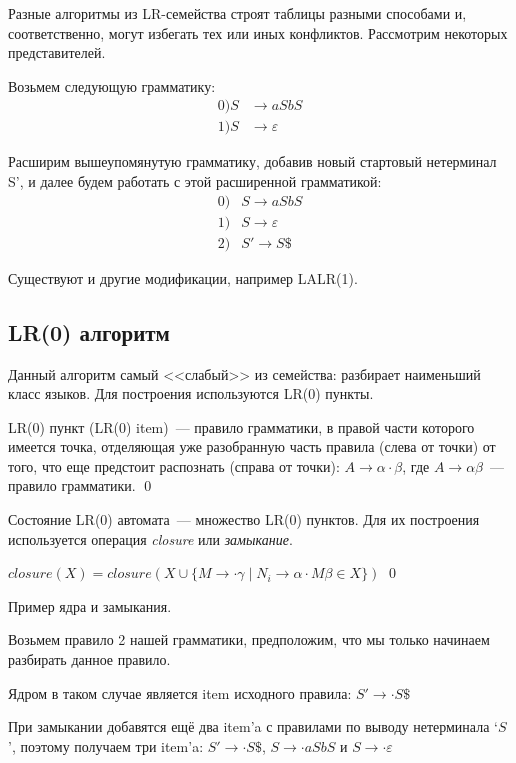 Разные алгоритмы из LR-семейства строят таблицы разными способами и, соответственно, могут избегать тех или иных конфликтов. Рассмотрим некоторых представителей.

Возьмем следующую грамматику:
\begin{align*}
0) S & \rightarrow a S b S \\
1) S & \rightarrow \varepsilon
\end{align*}

Расширим вышеупомянутую грамматику, добавив новый стартовый нетерминал S', и далее будем работать с этой расширенной грамматикой:
\begin{align*}
0)& S \rightarrow a S b S \\
1)& S \rightarrow \varepsilon \\
2)& S' \rightarrow S \$
\end{align*}

Существуют и другие модификации, например LALR(1).

\subsection{LR(0) алгоритм}

Данный алгоритм самый <<слабый>> из семейства: разбирает наименьший класс языков.
Для построения используются LR(0) пункты.

\begin{definition}
LR(0) пункт (LR(0) item)~--- правило грамматики, в правой части которого имеется точка, отделяющая уже разобранную часть правила (слева от точки) от того, что еще предстоит распознать (справа от точки): $A \to \alpha \cdot \beta$, где $A \to \alpha \beta$~--- правило грамматики.
\qed
\end{definition}

Состояние LR(0) автомата~--- множество LR(0) пунктов. Для их построения используется операция \textit{closure} или \textit{замыкание}.

\begin{definition}
$closure(X)  = closure(X \cup \{M \rightarrow \cdot \gamma \mid N_i \rightarrow \alpha\cdot M\beta \in X \})$
\qed
\end{definition}

\begin{example}
Пример ядра и замыкания.

Возьмем правило 2 нашей грамматики, предположим, что мы только начинаем разбирать данное правило.

Ядром в таком случае является item исходного правила: $S' \rightarrow \cdot S \$$

При замыкании добавятся ещё два item'a с правилами по выводу нетерминала `$S$', поэтому получаем три item'a: $S' \rightarrow \cdot S\$$, $S \rightarrow \cdot aSbS$ и $S \rightarrow \cdot \varepsilon$
\end{example}

